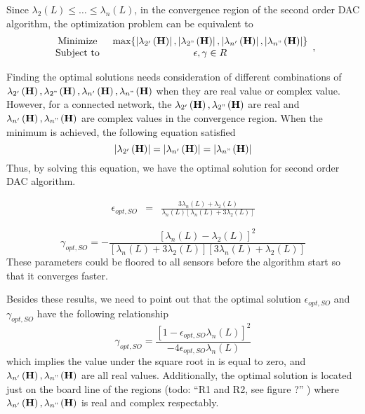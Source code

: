 Since $\lambda_{2}\left(L\right)\leq\dots\leq\lambda_{n}\left(L\right)$,
in the convergence region of the second order DAC algorithm, the optimization
problem  can be equivalent to 
\[
\begin{array}{cc}
\mbox{Minimize } & \mbox{max}\{\left|\lambda_{2'}\left(\mathbf{H}\right)\right|,\left|\lambda_{2"}\left(\mathbf{H}\right)\right|,\left|\lambda_{n'}\left(\mathbf{H}\right)\right|,\left|\lambda_{n"}\left(\mathbf{H}\right)\right|\}\\
\mbox{Subject to } & \epsilon,\gamma\in R
\end{array},
\]


Finding the optimal solutions needs consideration of different combinations
of $\lambda_{2'}\left(\mathbf{H}\right),\lambda_{2"}\left(\mathbf{H}\right),\lambda_{n'}\left(\mathbf{H}\right),\lambda_{n"}\left(\mathbf{H}\right)$
when they are real value or complex value. However, for a connected
network, the $\lambda_{2'}\left(\mathbf{H}\right),\lambda_{2"}\left(\mathbf{H}\right)$
are real and $\lambda_{n'}\left(\mathbf{H}\right),\lambda_{n"}\left(\mathbf{H}\right)$
are complex values in the convergence region. When the minimum is
achieved, the following equation satisfied
\[
\left|\lambda_{2'}\left(\mathbf{H}\right)\right|=\left|\lambda_{n'}\left(\mathbf{H}\right)\right|=\left|\lambda_{n"}\left(\mathbf{H}\right)\right|
\]
Thus, by solving this equation, we have the optimal solution for second
order DAC algorithm.

\begin{eqnarray}
\epsilon{}_{opt,SO} & = & \frac{3\lambda_{n}(L)+\lambda_{2}(L)}{\lambda_{n}(L)\left[\lambda_{n}(L)+3\lambda_{2}(L)\right]}
\end{eqnarray}


\begin{equation}
\gamma_{opt,SO}=-\frac{\left[\lambda_{n}(L)-\lambda_{2}(L)\right]^{2}}{\left[\lambda_{n}(L)+3\lambda_{2}(L)\right]\left[3\lambda_{n}(L)+\lambda_{2}(L)\right]}
\end{equation}
These parameters could be floored to all sensors before the algorithm
start so that it converges faster.

Besides these results, we need to point out that the optimal solution
$\epsilon{}_{opt,SO}$ and $\gamma_{opt,SO}$ have the following relationship
\[
\gamma_{opt,SO}=\frac{\left[1-\epsilon{}_{opt,SO}\lambda_{n}\left(L\right)\right]^{2}}{-4\epsilon{}_{opt,SO}\lambda_{n}\left(L\right)}
\]
which implies the value under the square root in 
is equal to zero, and $\lambda_{n'}\left(\mathbf{H}\right),\lambda_{n"}\left(\mathbf{H}\right)$
are all real values. Additionally, the optimal solution is located
just on the board line of the regions (todo: ``R1 and R2, see figure
?'' ) where $\lambda_{n'}\left(\mathbf{H}\right),\lambda_{n"}\left(\mathbf{H}\right)$
is real and complex respectably. 


